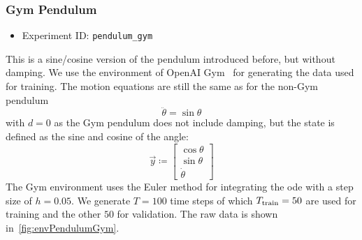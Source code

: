 		\subsubsection{Gym Pendulum}
			\begin{itemize}
				\item Experiment ID: \texttt{pendulum\_gym}
			\end{itemize}

			This is a sine/cosine version of the pendulum introduced before, but without damping. We use the environment of OpenAI Gym~\cite{brockmanOpenAIGym2016} for generating the data used for training. The motion equations are still the same as for the non-Gym pendulum
			\begin{equation*}
				\ddot{\theta} = \sin\theta
			\end{equation*}
			with \( d = 0 \) as the Gym pendulum does not include damping, but the state is defined as the sine and cosine of the angle:
			\begin{equation*}
				\vec{y} \coloneqq
					\begin{bmatrix}
						\cos\theta \\
						\sin\theta \\
						\dot{\theta}
					\end{bmatrix}
			\end{equation*}
			The Gym environment uses the Euler method for integrating the \ac{ode} with a step size of \( h = 0.05 \). We generate \( T = 100 \) time steps of which \( T_{\mathrm{train}} = 50 \) are used for training and the other \(50\) for validation. The raw data is shown in~\autoref{fig:envPendulumGym}.

